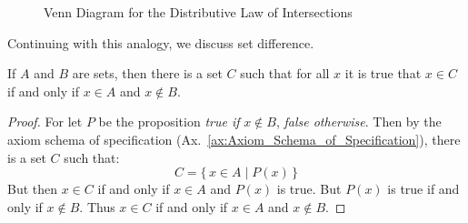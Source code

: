         \begin{figure}[H]
            \centering
            \captionsetup{type=figure}
            \caption{Venn Diagram for the Distributive Law of Intersections}
            \label{fig:Venn_Diagram_Distributive_Law_of_Intersections}
        \end{figure}
        Continuing with this analogy, we discuss set difference.
        \begin{theorem}
            \label{thm:Existence_of_Set_Difference}%
            If $A$ and $B$ are sets, then there is a set $C$ such that for all
            $x$ it is true that $x\in{C}$ if and only if $x\in{A}$ and
            $x\notin{B}$.
        \end{theorem}
        \begin{proof}
            For let $P$ be the proposition \textit{true if} $x\notin{B}$,
            \textit{false otherwise}. Then by the axiom schema of specification
            (Ax.~\ref{ax:Axiom_Schema_of_Specification}), there is a set $C$
            such that:
            \begin{equation}
                C=\{\,x\in{A}\;|\;P(x)\,\}
            \end{equation}
            But then $x\in{C}$ if and only if $x\in{A}$ and $P(x)$ is true.
            But $P(x)$ is true if and only if $x\notin{B}$. Thus $x\in{C}$ if
            and only if $x\in{A}$ and $x\notin{B}$.
        \end{proof}
